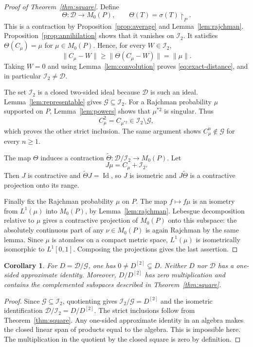 \documentclass[11pt,reqno]{amsart}
\newtheorem{corollary}[theorem]{Corollary}
\theoremstyle{definition}
\theoremstyle{remark}
\newcommand{\D}{\mathcal D}
\newcommand{\G}{\mathcal G}
\newcommand{\I}{\mathcal I}
\newcommand{\Id}{\operatorname{Id}}
\newcommand{\restr}[2]{#1\!\upharpoonright_{#2}}
\begin{document}
\begin{proof}[Proof of Theorem~\ref{thm:square}]
Define
\[
 \Theta:\D\longrightarrow M_0(P),\qquad
 \Theta(T)=\restr{\sigma(T)}{P}.
\]
This is a contraction by Proposition~\ref{prop:average} and Lemma~\ref{lem:rajchman}. Proposition~\ref{prop:annihilation} shows that it vanishes on $\I_2$. It satisfies $\Theta(C_\mu)=\mu$ for $\mu\in M_0(P)$. Hence, for every $W\in\I_2$,
\[
 \|C_\mu-W\|\geq\|\Theta(C_\mu-W)\|=\|\mu\|.
\]
Taking $W=0$ and using Lemma~\ref{lem:convolution} proves \eqref{eq:exact-distance}, and in particular $\I_2\ne\D$.

The set $\I_2$ is a closed two-sided ideal because $\D$ is such an ideal. Lemma~\ref{lem:representable} gives $\G\subseteq\I_2$. For a Rajchman probability $\mu$ supported on $P$, Lemma~\ref{lem:powers} shows that $\mu^{*2}$ is singular. Thus
\[
 C_\mu^2=C_{\mu^{*2}}\in\I_2\setminus\G,
\]
which proves the other strict inclusion. The same argument shows $C_\mu^n\notin\G$ for every $n\geq1$.

The map $\Theta$ induces a contraction $\widetilde\Theta:\D/\I_2\to M_0(P)$. Let
\[
 J\mu=C_\mu+\I_2.
\]
Then $J$ is contractive and $\widetilde\Theta J=\Id$, so $J$ is isometric and $J\widetilde\Theta$ is a contractive projection onto its range.

Finally fix the Rajchman probability $\mu$ on $P$. The map $f\mapsto f\mu$ is an isometry from $L^1(\mu)$ into $M_0(P)$, by Lemma~\ref{lem:rajchman}. Lebesgue decomposition relative to $\mu$ gives a contractive projection of $M_0(P)$ onto this subspace: the absolutely continuous part of any $\nu\in M_0(P)$ is again Rajchman by the same lemma. Since $\mu$ is atomless on a compact metric space, $L^1(\mu)$ is isometrically isomorphic to $L^1[0,1]$. Composing the projections gives the last assertion.
\end{proof}

\begin{corollary}\label{cor:quotient}
For $D=\D/\G$, one has $0\ne D^{[2]}\subsetneq D$. Neither $D$ nor $\D$ has a one-sided approximate identity. Moreover, $D/D^{[2]}$ has zero multiplication and contains the complemented subspaces described in Theorem~\ref{thm:square}.
\end{corollary}
\begin{proof}
Since $\G\subseteq\I_2$, quotienting gives $\I_2/\G=D^{[2]}$ and the isometric identification $\D/\I_2=D/D^{[2]}$. The strict inclusions follow from Theorem~\ref{thm:square}. Any one-sided approximate identity in an algebra makes the closed linear span of products equal to the algebra. This is impossible here. The multiplication in the quotient by the closed square is zero by definition.
\end{proof}
\end{document}
